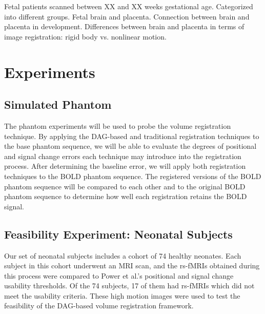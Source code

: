 Fetal patients scanned between XX and XX weeks gestational age. Categorized into different groups. Fetal brain and placenta. Connection between brain and placenta in development. Differences between brain and placenta in terms of image registration: rigid body vs. nonlinear motion.


\section{Experiments}

\subsection{Simulated Phantom}

The phantom experiments will be used to probe the volume registration technique. By applying the DAG-based and traditional registration techniques to the base phantom sequence, we will be able to evaluate the degrees of positional and signal change errors each technique may introduce into the registration process. After determining the baseline error, we will apply both registration techniques to the BOLD phantom sequence. The registered versions of the BOLD phantom sequence will be compared to each other and to the original BOLD phantom sequence to determine how well each registration retains the BOLD signal.


\subsection{Feasibility Experiment: Neonatal Subjects}


Our set of neonatal subjects includes a cohort of 74 healthy neonates. Each subject in this cohort underwent an MRI scan, and the rs-fMRIs obtained during this process were compared to Power et al.'s positional and signal change usability thresholds. Of the 74 subjects, 17 of them had rs-fMRIs which did not meet the usability criteria. These high motion images were used to test the feasibility of the DAG-based volume registration framework. 

